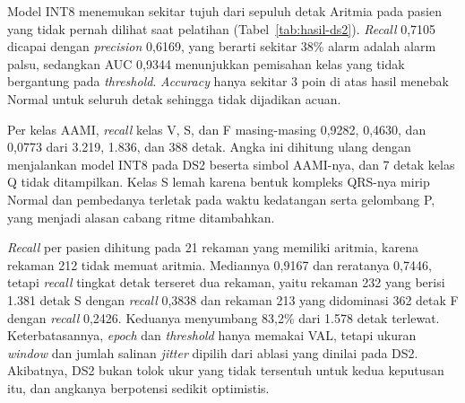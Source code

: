 Model INT8 menemukan sekitar tujuh dari sepuluh detak Aritmia pada pasien yang tidak pernah dilihat saat pelatihan (Tabel~\ref{tab:hasil-ds2}). \textit{Recall} 0,7105 dicapai dengan \textit{precision} 0,6169, yang berarti sekitar 38\% alarm adalah alarm palsu, sedangkan AUC 0,9344 menunjukkan pemisahan kelas yang tidak bergantung pada \textit{threshold}. \textit{Accuracy} hanya sekitar 3 poin di atas hasil menebak Normal untuk seluruh detak sehingga tidak dijadikan acuan.

Per kelas AAMI, \textit{recall} kelas V, S, dan F masing-masing 0,9282, 0,4630, dan 0,0773 dari 3.219, 1.836, dan 388 detak. Angka ini dihitung ulang dengan menjalankan model INT8 pada DS2 beserta simbol AAMI-nya, dan 7 detak kelas Q tidak ditampilkan. Kelas S lemah karena bentuk kompleks QRS-nya mirip Normal dan pembedanya terletak pada waktu kedatangan serta gelombang P, yang menjadi alasan cabang ritme ditambahkan.

\textit{Recall} per pasien dihitung pada 21 rekaman yang memiliki aritmia, karena rekaman 212 tidak memuat aritmia. Mediannya 0,9167 dan reratanya 0,7446, tetapi \textit{recall} tingkat detak terseret dua rekaman, yaitu rekaman 232 yang berisi 1.381 detak S dengan \textit{recall} 0,3838 dan rekaman 213 yang didominasi 362 detak F dengan \textit{recall} 0,2426. Keduanya menyumbang 83,2\% dari 1.578 detak terlewat. Keterbatasannya, \textit{epoch} dan \textit{threshold} hanya memakai VAL, tetapi ukuran \textit{window} dan jumlah salinan \textit{jitter} dipilih dari ablasi yang dinilai pada DS2. Akibatnya, DS2 bukan tolok ukur yang tidak tersentuh untuk kedua keputusan itu, dan angkanya berpotensi sedikit optimistis.

